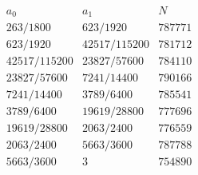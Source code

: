 \[
\begin{array}{c|c|r}
a_0&a_1&N\\ \hline
263/1800&623/1920&787771\\
623/1920&42517/115200&781712\\
42517/115200&23827/57600&784110\\
23827/57600&7241/14400&790166\\
7241/14400&3789/6400&785541\\
3789/6400&19619/28800&777696\\
19619/28800&2063/2400&776559\\
2063/2400&5663/3600&787788\\
5663/3600&3&754890
\end{array}
\]
